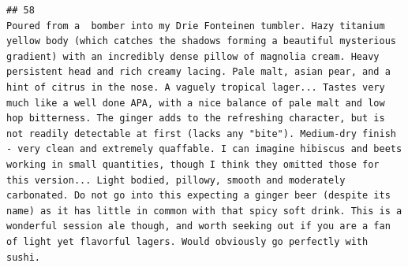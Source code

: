 \documentclass[
  a4paper,
]{article}
\begin{document}
\begin{verbatim}
## 58                                                                                                                                                                                                                                                                                                                                                                                                                                                                                                                                                                                                                                                                                                                                                                                                                                                                                                                                                                                                                                                                                             Poured from a  bomber into my Drie Fonteinen tumbler. Hazy titanium yellow body (which catches the shadows forming a beautiful mysterious gradient) with an incredibly dense pillow of magnolia cream. Heavy persistent head and rich creamy lacing. Pale malt, asian pear, and a hint of citrus in the nose. A vaguely tropical lager... Tastes very much like a well done APA, with a nice balance of pale malt and low hop bitterness. The ginger adds to the refreshing character, but is not readily detectable at first (lacks any "bite"). Medium-dry finish - very clean and extremely quaffable. I can imagine hibiscus and beets working in small quantities, though I think they omitted those for this version... Light bodied, pillowy, smooth and moderately carbonated. Do not go into this expecting a ginger beer (despite its name) as it has little in common with that spicy soft drink. This is a wonderful session ale though, and worth seeking out if you are a fan of light yet flavorful lagers. Would obviously go perfectly with sushi.

\end{verbatim}
\end{document}
